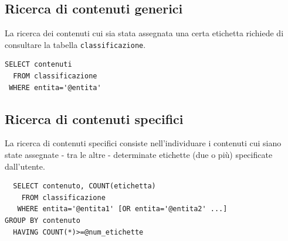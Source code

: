 \documentclass[10pt,a4paper,headinclude,footinclude,hidelinks]{scrreprt} %
\begin{document}
	\subsection{Ricerca di contenuti generici}
	La ricerca dei contenuti cui sia stata assegnata una certa etichetta richiede di consultare la tabella \texttt{classificazione}.
\begin{verbatim}
SELECT contenuti
  FROM classificazione
 WHERE entita='@entita'
\end{verbatim}

	\subsection{Ricerca di contenuti specifici}
	La ricerca di contenuti specifici consiste nell'individuare i contenuti cui siano state assegnate - tra le altre - determinate etichette (due o più) specificate dall'utente. 
\begin{verbatim}
  SELECT contenuto, COUNT(etichetta)
    FROM classificazione
   WHERE entita='@entita1' [OR entita='@entita2' ...]
GROUP BY contenuto
  HAVING COUNT(*)>=@num_etichette
\end{verbatim}
\end{document}
